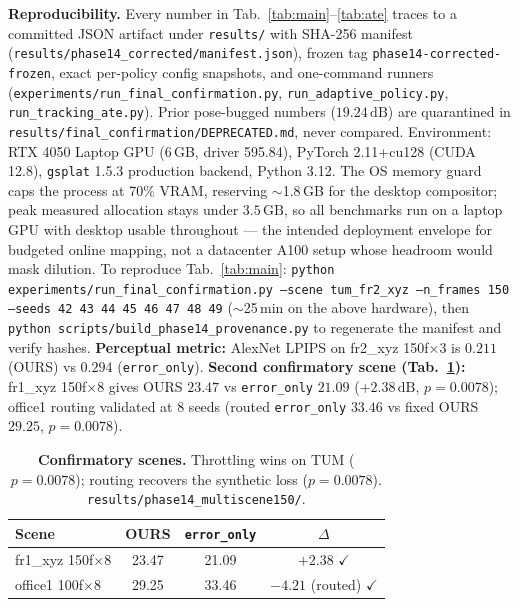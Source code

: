 \documentclass[10pt,twocolumn,letterpaper]{article}
\begin{document}
\textbf{Reproducibility.} Every number in Tab.~\ref{tab:main}--\ref{tab:ate} traces to a committed JSON artifact under \texttt{results/} with SHA-256 manifest (\texttt{results/phase14\_corrected/manifest.json}), frozen tag \texttt{phase14-corrected-frozen}, exact per-policy config snapshots, and one-command runners (\texttt{experiments/run\_final\_confirmation.py}, \texttt{run\_adaptive\_policy.py}, \texttt{run\_tracking\_ate.py}). Prior pose-bugged numbers ($19.24\,\mathrm{dB}$) are quarantined in \texttt{results/final\_confirmation/DEPRECATED.md}, never compared.
Environment: RTX 4050 Laptop GPU (6\,GB, driver 595.84), PyTorch 2.11+cu128 (CUDA 12.8), \texttt{gsplat} 1.5.3 production backend, Python 3.12.
The OS memory guard caps the process at 70\% VRAM, reserving $\sim$1.8\,GB for the desktop compositor; peak measured allocation stays under $3.5\,\mathrm{GB}$, so all benchmarks run on a laptop GPU with desktop usable throughout --- the intended deployment envelope for budgeted online mapping, not a datacenter A100 setup whose headroom would mask dilution.
To reproduce Tab.~\ref{tab:main}: \texttt{python experiments/run\_final\_confirmation.py --scene tum\_fr2\_xyz --n\_frames 150 --seeds 42 43 44 45 46 47 48 49} ($\sim$25\,min on the above hardware), then \texttt{python scripts/build\_phase14\_provenance.py} to regenerate the manifest and verify hashes.
\textbf{Perceptual metric:} AlexNet LPIPS on fr2\_xyz 150f$\times$3 is $0.211$ (OURS) vs $0.294$ (\texttt{error\_only}).
\textbf{Second confirmatory scene (Tab.~\ref{tab:confirm2}):} fr1\_xyz 150f$\times$8 gives OURS $23.47$ vs \texttt{error\_only} $21.09$ ($+2.38\,\mathrm{dB}$, $p=0.0078$); office1 routing validated at 8 seeds (routed \texttt{error\_only} $33.46$ vs fixed OURS $29.25$, $p=0.0078$).

\begin{table}[tbp]
\centering
\footnotesize\setlength{\tabcolsep}{3pt}
\begin{tabular}{lccc}
\toprule
\textbf{Scene} & \textbf{OURS} & \textbf{\texttt{error\_only}} & \textbf{$\Delta$} \\
\midrule
fr1\_xyz 150f$\times$8 & 23.47 & 21.09 & $+2.38$ $\checkmark$ \\
office1 100f$\times$8 & 29.25 & 33.46 & $-4.21$ (routed) $\checkmark$ \\
\bottomrule
\end{tabular}
\caption{\textbf{Confirmatory scenes.} Throttling wins on TUM ($p=0.0078$); routing recovers the synthetic loss ($p=0.0078$). \texttt{results/phase14\_multiscene150/}.}
\label{tab:confirm2}
\end{table}
\end{document}
